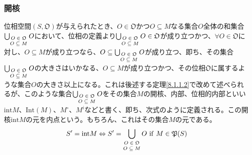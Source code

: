 \documentclass[dvipdfmx]{jsarticle}
\begin{document}
\subsubsection{開核}%
\begin{dfn}
位相空間$\left( S,\mathfrak{O} \right)$が与えられたとき、$O \in \mathfrak{O}$かつ$O \subseteq M$なる集合$O$全体の和集合$\bigcup_{\scriptsize \begin{matrix}
O \in \mathfrak{O} \\
O \subseteq M \\
\end{matrix}} O$において、位相の定義より$\bigcup_{\scriptsize \begin{matrix}
O \in \mathfrak{O} \\
O \subseteq M \\
\end{matrix}} O\in \mathfrak{O}$が成り立つかつ、$\forall O \in \mathfrak{O}$に対し、$O \subseteq M$が成り立つなら、$O \subseteq \bigcup_{\scriptsize \begin{matrix}
O \in \mathfrak{O} \\
O \subseteq M \\
\end{matrix}} O$が成り立つ、即ち、その集合$\bigcup_{\scriptsize \begin{matrix}
O \in \mathfrak{O} \\
O \subseteq M \\
\end{matrix}} O$の大きさはいかなる、$O \subseteq M$が成り立つかつ、その位相$\mathfrak{O}$に属するような集合$O$の大きさ以上になる。これは後述する定理\ref{8.1.1.2}で改めて述べられるが、このような集合$\bigcup_{\scriptsize \begin{matrix}
O \in \mathfrak{O} \\
O \subseteq M \\
\end{matrix}} O$をその集合$M$の開核、内部、位相的内部といい${\mathrm{int}}M$、$\mathrm{Int}(M)$、$M^{\circ}$、$M^{i}$などと書く、即ち、次式のように定義される。この開核${\mathrm{int}}M$の元を内点という。もちろん、これはその集合$M$の元である。
\begin{align*}
S' = {\mathrm{int}}M \Leftrightarrow S' = \bigcup_{\scriptsize \begin{matrix}
O \in \mathfrak{O} \\
O \subseteq M \\
\end{matrix}} O\ \mathrm{if}\ M \in \mathfrak{P}(S)
\end{align*}
\end{dfn}\par
\end{document}
